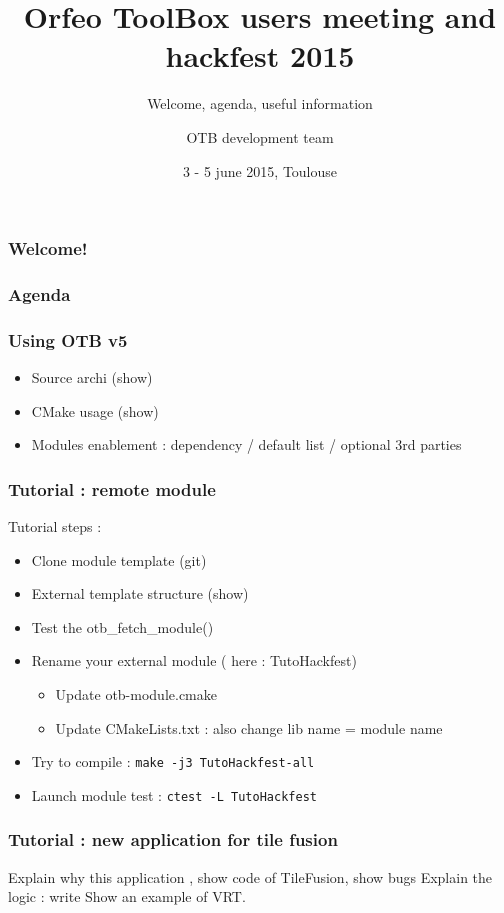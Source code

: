 \documentclass[8pt]{beamer}
\title{Orfeo ToolBox users meeting and hackfest 2015}
\subtitle{Welcome, agenda, useful information}
\author{OTB development team}%
\date{3 - 5 june 2015, Toulouse}
\begin{document}
\begin{frame}
\titlepage
\end{frame}

\begin{frame}
\frametitle{Welcome!}

\end{frame}

\begin{frame}
\frametitle{Agenda}

\end{frame}

\begin{frame}
\frametitle{Using OTB v5}

\begin{itemize}
\item Source archi (show)
\item CMake usage (show)
\item Modules enablement : dependency / default list / optional 3rd parties
\end{itemize}

\end{frame}

\begin{frame}
\frametitle{Tutorial : remote module}

Tutorial steps :
\begin{itemize}
\item Clone module template (git)
\item External template structure (show)
\item Test the otb_fetch_module()
\item Rename your external module ( here : TutoHackfest)
  \begin{itemize}
  \item Update otb-module.cmake
  \item Update CMakeLists.txt : also change lib name = module name
  \end{itemize}
\item Try to compile : \texttt{make -j3 TutoHackfest-all}
\item Launch module test : \texttt{ctest -L TutoHackfest}
\end{itemize}

\end{frame}

\begin{frame}
\frametitle{Tutorial : new application for tile fusion}

Explain why this application , show code of TileFusion, show bugs 
Explain the logic : write 
Show an example of VRT.

\end{frame}
\end{document}

